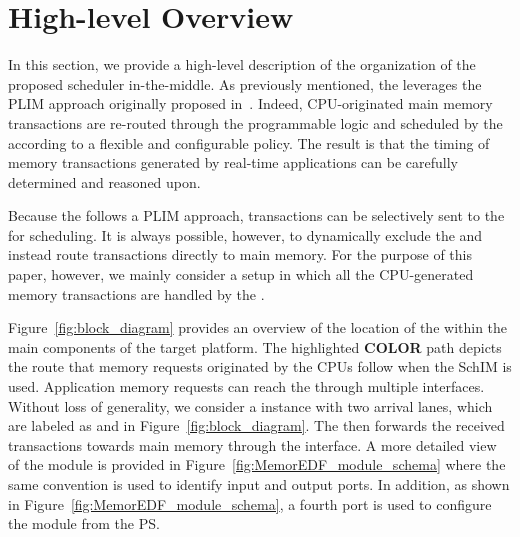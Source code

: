\section{High-level Overview}

In this section, we provide a high-level description of the
organization of the proposed scheduler in-the-middle. As previously
mentioned, the \schim leverages the PLIM approach originally proposed
in~\cite{PLIM20}. Indeed, CPU-originated main memory transactions are
re-routed through the programmable logic and scheduled by the \schim
according to a flexible and configurable policy. The result is that
the timing of memory transactions generated by real-time applications
can be carefully determined and reasoned upon. 




Because the \schim follows a PLIM approach, transactions can be
selectively sent to the \schim for scheduling. It is always possible,
however, to dynamically exclude the \schim and instead route
transactions directly to main memory. For the purpose of this paper,
however, we mainly consider a setup in which all the CPU-generated
memory transactions are handled by the \schim.

Figure~\ref{fig:block_diagram} provides an overview of the location of
the \schim within the main components of the target platform. The
highlighted {\bf COLOR} path depicts the route that memory requests
originated by the CPUs follow when the SchIM is used. Application
memory requests can reach the \schim through multiple
interfaces. Without loss of generality, we consider a \schim instance
with two arrival lanes, which are labeled as  and 
in Figure~\ref{fig:block_diagram}. The \schim then forwards the
received transactions towards main memory through the 
interface. A more detailed view of the \schim module is provided in
Figure~\ref{fig:MemorEDF_module_schema} where the same convention is
used to identify input and output ports. In addition, as shown in
Figure~\ref{fig:MemorEDF_module_schema}, a fourth  port is
used to configure the \schim module from the PS.

